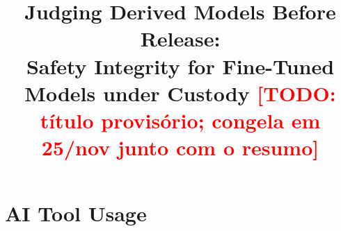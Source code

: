 \documentclass[conference]{IEEEtran}
\newcommand{\todo}[1]{\textcolor{red}{[TODO: #1]}}
\begin{document}
\title{Judging Derived Models Before Release:\\
Safety Integrity for Fine-Tuned Models under Custody
\todo{título provisório; congela em 25/nov junto com o resumo}}

\author{
}

\maketitle














\section*{AI Tool Usage}




\end{document}

